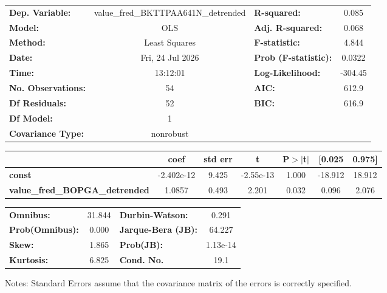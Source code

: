 \begin{center}
\begin{tabular}{lclc}
\toprule
\textbf{Dep. Variable:}                & value\_fred\_BKTTPAA641N\_detrended & \textbf{  R-squared:         } &     0.085   \\
\textbf{Model:}                        &                 OLS                 & \textbf{  Adj. R-squared:    } &     0.068   \\
\textbf{Method:}                       &            Least Squares            & \textbf{  F-statistic:       } &     4.844   \\
\textbf{Date:}                         &           Fri, 24 Jul 2026          & \textbf{  Prob (F-statistic):} &   0.0322    \\
\textbf{Time:}                         &               13:12:01              & \textbf{  Log-Likelihood:    } &   -304.45   \\
\textbf{No. Observations:}             &                    54               & \textbf{  AIC:               } &     612.9   \\
\textbf{Df Residuals:}                 &                    52               & \textbf{  BIC:               } &     616.9   \\
\textbf{Df Model:}                     &                     1               & \textbf{                     } &             \\
\textbf{Covariance Type:}              &              nonrobust              & \textbf{                     } &             \\
\bottomrule
\end{tabular}
\begin{tabular}{lcccccc}
                                       & \textbf{coef} & \textbf{std err} & \textbf{t} & \textbf{P$> |$t$|$} & \textbf{[0.025} & \textbf{0.975]}  \\
\midrule
\textbf{const}                         &   -2.402e-12  &        9.425     & -2.55e-13  &         1.000        &      -18.912    &       18.912     \\
\textbf{value\_fred\_BOPGA\_detrended} &       1.0857  &        0.493     &     2.201  &         0.032        &        0.096    &        2.076     \\
\bottomrule
\end{tabular}
\begin{tabular}{lclc}
\textbf{Omnibus:}       & 31.844 & \textbf{  Durbin-Watson:     } &    0.291  \\
\textbf{Prob(Omnibus):} &  0.000 & \textbf{  Jarque-Bera (JB):  } &   64.227  \\
\textbf{Skew:}          &  1.865 & \textbf{  Prob(JB):          } & 1.13e-14  \\
\textbf{Kurtosis:}      &  6.825 & \textbf{  Cond. No.          } &     19.1  \\
\bottomrule
\end{tabular}
\end{center}

Notes: \newline
 [1] Standard Errors assume that the covariance matrix of the errors is correctly specified.